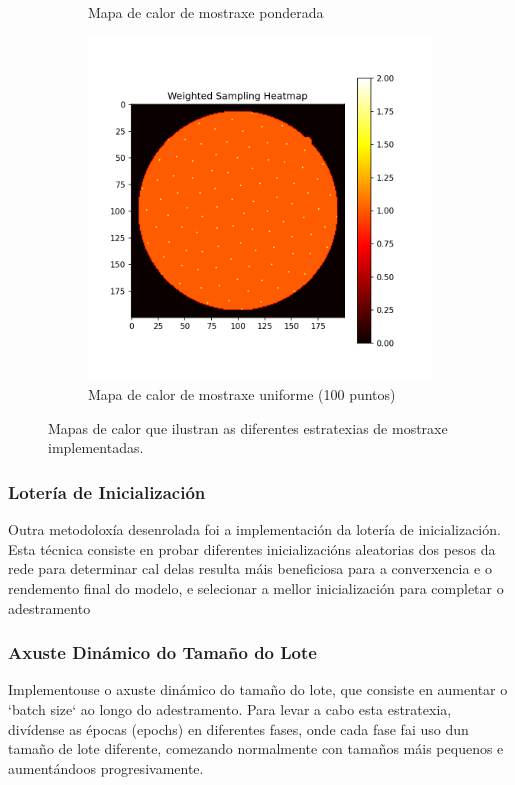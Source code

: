 \begin{figure}[tbp]
\begin{subfigure}[b]{0.3\textwidth}
        \caption{Mapa de calor de mostraxe ponderada}
        \label{fig:weighted_sampling_heatmap}
    \end{subfigure}
    \hfill
    \begin{subfigure}[b]{0.3\textwidth}
        \centering
        \includegraphics[width=\textwidth]{imaxes/muestraje/uniform_sampling_heatmap.png}
        \caption{Mapa de calor de mostraxe uniforme (100 puntos)}
        \label{fig:uniform_sampling_heatmap}
    \end{subfigure}
    \caption{Mapas de calor que ilustran as diferentes estratexias de mostraxe implementadas.}
    \label{fig:sampling_heatmaps}
\end{figure}

\subsubsection{Lotería de Inicialización}
\label{subsubsec:loteria_inicializacion}
Outra metodoloxía desenrolada foi a implementación da lotería de inicialización. Esta técnica consiste en probar diferentes inicializacións aleatorias dos pesos da rede para determinar cal delas resulta máis beneficiosa para a converxencia e o rendemento final do modelo, e selecionar a mellor inicialización para completar o adestramento

\subsubsection{Axuste Dinámico do Tamaño do Lote}
\label{subsubsec:axuste_dinamico_batch_size}
Implementouse o axuste dinámico do tamaño do lote, que consiste en aumentar o `batch size` ao longo do adestramento. Para levar a cabo esta estratexia, divídense as épocas (epochs) en diferentes fases, onde cada fase fai uso dun tamaño de lote diferente, comezando normalmente con tamaños máis pequenos e aumentándoos progresivamente.




